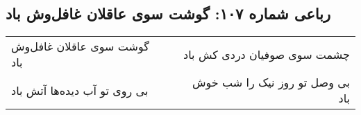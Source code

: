 \begin{center}
\section*{رباعی شماره ۱۰۷: گوشت سوی عاقلان غافل‌وش باد}
\label{sec:sh107}
\begin{longtable}{l p{0.5cm} r}
گوشت سوی عاقلان غافل‌وش باد
&&
چشمت سوی صوفیان دردی کش باد
\\
بی روی تو آب دیده‌ها آتش باد
&&
بی وصل تو روز نیک را شب خوش باد
\\
\end{longtable}
\end{center}
